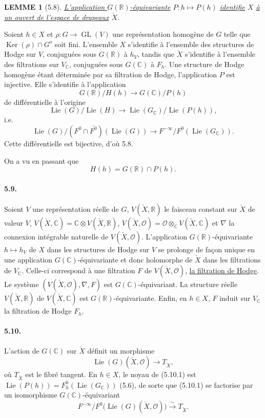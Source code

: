 \documentclass[10pt,leqno]{article}
\newcommand{\C}{\mathbb C}
\newcommand{\R}{\mathbb R}
\newcommand{\cO}{\mathcal O}
\newcommand{\Ker}{\operatorname{Ker}}
\theoremstyle{deligne}
\newtheorem*{lemme}{LEMME}
\newcommand{\Lie}{\operatorname{Lie}}
\newcommand{\GL}{\operatorname{GL}}
\renewcommand{\underline}[1]{\uline{#1}}
\begin{document}
\begin{lemme}[5.8]
\underline{L'application $G(\R)$-équivariante} $P:h\mapsto P(h)$ \underline{identifie} $X$ \underline{à un ouvert de l'espace de drapeaux} $\check X$.
\end{lemme}

Soient $h\in X$ et $\rho:G\to\GL(V)$ une représentation homogène de $G$ telle que $\Ker(\rho)\cap G^o$ soit fini. L'ensemble $X$ s'identifie à l'ensemble des structures de Hodge sur $V$, conjuguées sous $G(\R)$ à $h_V$, tandis que $\check X$ s'identifie à l'ensemble des filtrations sur $V_\C$, conjuguées sous $G(\C)$ à $F_h$. Une structure de Hodge homogène étant déterminée par sa filtration de Hodge, l'application $P$ est injective. Elle s'identifie à l'application
\[
  G(\R)/H(h)\longrightarrow G(\C)/P(h)
\]
de différentielle à l'origine
\[
  \Lie(G)/\Lie(H)\longrightarrow \Lie(G_\C)/\Lie(P(h)),
\]
i.e.
\[
  \Lie(G)/(F^0\cap\overline{F^0})(\Lie(G))
  \longrightarrow
  F^{-\infty}/F^0(\Lie(G_\C)).
\]
Cette différentielle est bijective, d'où 5.8.

On a vu en passant que
\[
\tag{5.8.1}
  H(h)=G(\R)\cap P(h).
\]

\paragraph{5.9.}
Soient $V$ une représentation réelle de $G$, $V(\check X,\R)$ le faisceau constant sur $\check X$ de valeur $V$, $V(\check X,\C)=\C\otimes V(\check X,\R)$, $V(\check X,\cO)=\cO\otimes_\C V(\check X,\C)$ et $\nabla$ la connexion intégrable naturelle de $V(\check X,\cO)$. L'application $G(\R)$-équivariante $h\mapsto h_V$ de $X$ dans les structures de Hodge sur $V$ se prolonge de façon unique en une application $G(\C)$-équivariante et donc holomorphe de $\check X$ dans les filtrations de $V_\C$. Celle-ci correspond à une filtration $F$ de $V(\check X,\cO)$, \underline{la filtration de Hodge}. Le système $(V(\check X,\cO),\nabla,F)$ est $G(\C)$-équivariant. La structure réelle $V(\check X,\R)$ de $V(\check X,\C)$ est $G(\R)$-équivariante. Enfin, en $h\in X$, $F$ induit sur $V_\C$ la filtration de Hodge $F_h$.

\paragraph{5.10.}
L'action de $G(\C)$ sur $\check X$ définit un morphisme
\[
\tag{5.10.1}
  \Lie(G)(\check X,\cO)\longrightarrow T_{\check X},
\]
où $T_{\check X}$ est le fibré tangent. En $h\in X$, le noyau de (5.10.1) est $\Lie(P(h))=F_h^0(\Lie(G_\C))$ (5.6), de sorte que (5.10.1) se factorise par un isomorphisme $G(\C)$-équivariant
\[
\tag{5.10.2}
  F^{-\infty}/F^0\bigl(\Lie(G)(\check X,\cO)\bigr)
  \xrightarrow{\sim} T_{\check X}.
\]
\end{document}
